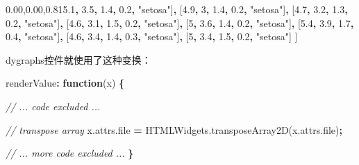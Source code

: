 \documentclass[]{book}
\newenvironment{Shaded}{\begin{snugshade}}{\end{snugshade}}
\newcommand{\KeywordTok}[1]{\textcolor[rgb]{0.13,0.29,0.53}{\textbf{#1}}}
\newcommand{\DecValTok}[1]{\textcolor[rgb]{0.00,0.00,0.81}{#1}}
\newcommand{\FloatTok}[1]{\textcolor[rgb]{0.00,0.00,0.81}{#1}}
\newcommand{\StringTok}[1]{\textcolor[rgb]{0.31,0.60,0.02}{#1}}
\newcommand{\CommentTok}[1]{\textcolor[rgb]{0.56,0.35,0.01}{\textit{#1}}}
\newcommand{\VariableTok}[1]{\textcolor[rgb]{0.00,0.00,0.00}{#1}}
\newcommand{\OperatorTok}[1]{\textcolor[rgb]{0.81,0.36,0.00}{\textbf{#1}}}
\newcommand{\AttributeTok}[1]{\textcolor[rgb]{0.77,0.63,0.00}{#1}}
\newcommand{\NormalTok}[1]{#1}
\theoremstyle{definition}
\theoremstyle{definition}
\theoremstyle{definition}
\theoremstyle{remark}
\begin{document}
\begin{Shaded}
\begin{Highlighting}[]
\NormalTok{[}
\NormalTok{  [}\FloatTok{5.1}\OperatorTok{,} \FloatTok{3.5}\OperatorTok{,} \FloatTok{1.4}\OperatorTok{,} \FloatTok{0.2}\OperatorTok{,} \StringTok{"setosa"}\NormalTok{]}\OperatorTok{,}
\NormalTok{  [}\FloatTok{4.9}\OperatorTok{,} \DecValTok{3}\OperatorTok{,} \FloatTok{1.4}\OperatorTok{,} \FloatTok{0.2}\OperatorTok{,} \StringTok{"setosa"}\NormalTok{]}\OperatorTok{,}
\NormalTok{  [}\FloatTok{4.7}\OperatorTok{,} \FloatTok{3.2}\OperatorTok{,} \FloatTok{1.3}\OperatorTok{,} \FloatTok{0.2}\OperatorTok{,} \StringTok{"setosa"}\NormalTok{]}\OperatorTok{,}
\NormalTok{  [}\FloatTok{4.6}\OperatorTok{,} \FloatTok{3.1}\OperatorTok{,} \FloatTok{1.5}\OperatorTok{,} \FloatTok{0.2}\OperatorTok{,} \StringTok{"setosa"}\NormalTok{]}\OperatorTok{,}
\NormalTok{  [}\DecValTok{5}\OperatorTok{,} \FloatTok{3.6}\OperatorTok{,} \FloatTok{1.4}\OperatorTok{,} \FloatTok{0.2}\OperatorTok{,} \StringTok{"setosa"}\NormalTok{]}\OperatorTok{,}
\NormalTok{  [}\FloatTok{5.4}\OperatorTok{,} \FloatTok{3.9}\OperatorTok{,} \FloatTok{1.7}\OperatorTok{,} \FloatTok{0.4}\OperatorTok{,} \StringTok{"setosa"}\NormalTok{]}\OperatorTok{,}
\NormalTok{  [}\FloatTok{4.6}\OperatorTok{,} \FloatTok{3.4}\OperatorTok{,} \FloatTok{1.4}\OperatorTok{,} \FloatTok{0.3}\OperatorTok{,} \StringTok{"setosa"}\NormalTok{]}\OperatorTok{,}
\NormalTok{  [}\DecValTok{5}\OperatorTok{,} \FloatTok{3.4}\OperatorTok{,} \FloatTok{1.5}\OperatorTok{,} \FloatTok{0.2}\OperatorTok{,} \StringTok{"setosa"}\NormalTok{]}
\NormalTok{] }
\end{Highlighting}
\end{Shaded}

dygraphs控件就使用了这种变换：

\begin{Shaded}
\begin{Highlighting}[]
\NormalTok{renderValue}\OperatorTok{:} \KeywordTok{function}\NormalTok{(x) }\OperatorTok{\{}
   
    \CommentTok{// ... code excluded ...}
    
    \CommentTok{// transpose array}
    \VariableTok{x}\NormalTok{.}\VariableTok{attrs}\NormalTok{.}\AttributeTok{file} \OperatorTok{=} \VariableTok{HTMLWidgets}\NormalTok{.}\AttributeTok{transposeArray2D}\NormalTok{(}\VariableTok{x}\NormalTok{.}\VariableTok{attrs}\NormalTok{.}\AttributeTok{file}\NormalTok{)}\OperatorTok{;}
    
    \CommentTok{// ... more code excluded ...}
\OperatorTok{\}}
\end{Highlighting}
\end{Shaded}
\end{document}
